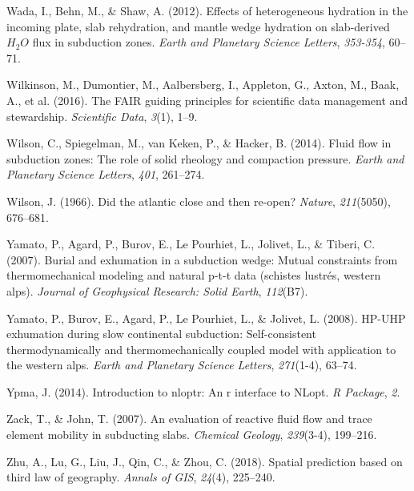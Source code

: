 \begin{CSLReferences}{1}{1}
\leavevmode{}%
Wada, I., Behn, M., \& Shaw, A. (2012). Effects of heterogeneous hydration in the incoming plate, slab rehydration, and mantle wedge hydration on slab-derived \(H_2O\) flux in subduction zones. \emph{Earth and Planetary Science Letters}, \emph{353-354}, 60--71.

\leavevmode{}%
Wilkinson, M., Dumontier, M., Aalbersberg, I., Appleton, G., Axton, M., Baak, A., et al. (2016). The FAIR guiding principles for scientific data management and stewardship. \emph{Scientific Data}, \emph{3}(1), 1--9.

\leavevmode{}%
Wilson, C., Spiegelman, M., van Keken, P., \& Hacker, B. (2014). Fluid flow in subduction zones: The role of solid rheology and compaction pressure. \emph{Earth and Planetary Science Letters}, \emph{401}, 261--274.

\leavevmode{}%
Wilson, J. (1966). Did the atlantic close and then re-open? \emph{Nature}, \emph{211}(5050), 676--681.

\leavevmode{}%
Yamato, P., Agard, P., Burov, E., Le Pourhiet, L., Jolivet, L., \& Tiberi, C. (2007). Burial and exhumation in a subduction wedge: Mutual constraints from thermomechanical modeling and natural p-t-t data (schistes lustr{é}s, western alps). \emph{Journal of Geophysical Research: Solid Earth}, \emph{112}(B7).

\leavevmode{}%
Yamato, P., Burov, E., Agard, P., Le Pourhiet, L., \& Jolivet, L. (2008). HP-UHP exhumation during slow continental subduction: Self-consistent thermodynamically and thermomechanically coupled model with application to the western alps. \emph{Earth and Planetary Science Letters}, \emph{271}(1-4), 63--74.

\leavevmode{}%
Ypma, J. (2014). Introduction to nloptr: An r interface to NLopt. \emph{R Package}, \emph{2}.

\leavevmode{}%
Zack, T., \& John, T. (2007). An evaluation of reactive fluid flow and trace element mobility in subducting slabs. \emph{Chemical Geology}, \emph{239}(3-4), 199--216.

\leavevmode{}%
Zhu, A., Lu, G., Liu, J., Qin, C., \& Zhou, C. (2018). Spatial prediction based on third law of geography. \emph{Annals of GIS}, \emph{24}(4), 225--240.

\end{CSLReferences}

